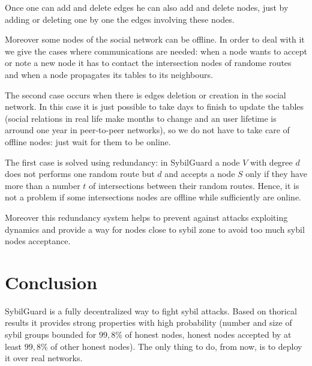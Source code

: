 \documentclass[a4paper,11pt]{article}
\begin{document}
Once one can add and delete edges he can also add and delete nodes, just by adding or deleting one by one the edges involving these nodes.


Moreover some nodes of the social network can be offline.
In order to deal with it we give the cases where communications are needed: when a node wants to accept or note a new node it has to contact the intersection nodes of randome routes and when a node propagates its tables to its neighbours.

The second case occurs when there is edges deletion or creation in the social network.
In this case it is just possible to take days to finish to update the tables (social relations in real life make months to change and an user lifetime is arround one year in peer-to-peer networks), so we do not have to take care of offline nodes: just wait for them to be online. 

The first case is solved using redundancy: in SybilGuard a node $V$ with degree $d$ does not performs one random route but $d$ and accepts a node $S$ only if they have more than a number $t$ of intersections between their random routes.
Hence, it is not a problem if some intersections nodes are offline while sufficiently are online.

Moreover this redundancy system helps to prevent against attacks exploiting dynamics and provide a way for nodes close to sybil zone to avoid too much sybil nodes acceptance. 

\section*{Conclusion}




SybilGuard is a fully decentralized way to fight sybil attacks.
Based on thorical results it provides strong properties with high probability (number and size of sybil groups bounded for $99,8\%$ of honest nodes, honest nodes accepted by at least $99,8\%$ of other honest nodes).
The only thing to do, from now, is to deploy it over real networks.

{}


\end{document}
